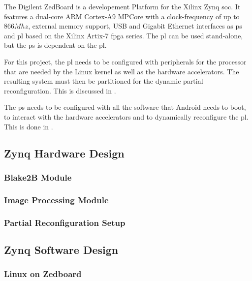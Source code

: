 The Digilent ZedBoard is a developement Platform for the Xilinx Zynq \gls{soc}.
It features a dual-core ARM Cortex-A9 MPCore with a clock-frequency of up to
$866 Mhz$, external memory support, USB and Gigabit Ethernet interfaces as
\gls{ps} and \gls{pl} based on the Xilinx Artix-7 \gls{fpga} series.
The \gls{pl} can be used stand-alone, but the \gls{ps} is dependent on the
\gls{pl}.

For this project, the \gls{pl} needs to be configured with peripherals for the
processor that are needed by the Linux kernel as well as the hardware
accelerators.
The resulting system must then be partitioned for the dynamic partial
reconfiguration.
This is discussed in .

The \gls{ps} needs to be configured with all the software that Android needs to
boot, to interact with the hardware accelerators and to dynamically reconfigure
the \gls{pl}.
This is done in .
\subsection{Zynq Hardware Design}\label{ssec:zynqhardwaredesign}

\subsubsection{Blake2B Module}\label{sssec:blake2bmodule}

\subsubsection{Image Processing Module}\label{sssec:imageprocessingmodule}

\subsubsection{Partial Reconfiguration Setup}\label{sssec:partialreconfigurationsetup}

\subsection{Zynq Software Design}\label{ssec:zynqsoftwaredesign}

\subsubsection{Linux on Zedboard}\label{sssec:linuxonzedboard}

